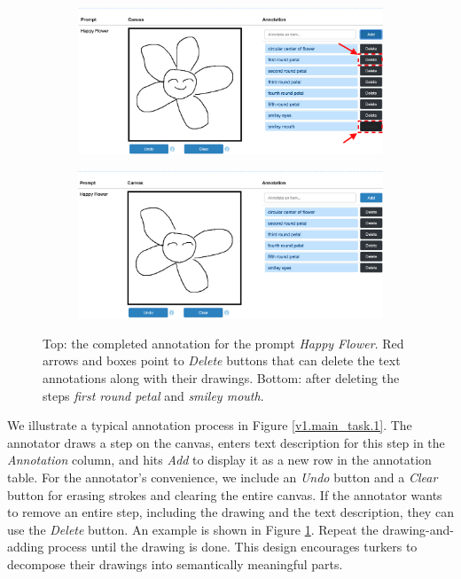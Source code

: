 \begin{figure}[!h]
\begin{subfigure}{\textwidth}
\centering
\includegraphics[width=.8\linewidth]{data_collection/v1_before_delete.png}  
\end{subfigure}
\newline
\begin{subfigure}{\textwidth}
\centering
\includegraphics[width=.8\linewidth]{data_collection/v1_after_delete.png}  
\end{subfigure}
\caption{Top: the completed annotation for the prompt \textit{Happy Flower}. Red arrows and boxes point to \textit{Delete} buttons that can delete the text annotations along with their drawings. Bottom: after deleting the steps \textit{first round petal} and \textit{smiley mouth}.}
\label{v1.main_task.delete}
\end{figure}

We illustrate a typical annotation process in Figure \ref{v1.main_task.1}. 
The annotator draws a step on the canvas, enters text description for this step in the \textit{Annotation} column, and hits \textit{Add} to display it as a new row in the annotation table. 
For the annotator's convenience, we include an \textit{Undo} button and a \textit{Clear} button for erasing strokes and clearing the entire canvas. 
If the annotator wants to remove an entire step, including the drawing and the text description, they can use the \textit{Delete} button. An example is shown in Figure \ref{v1.main_task.delete}.
Repeat the drawing-and-adding process until the drawing is done. 
This design encourages turkers to decompose their drawings into semantically meaningful parts.

